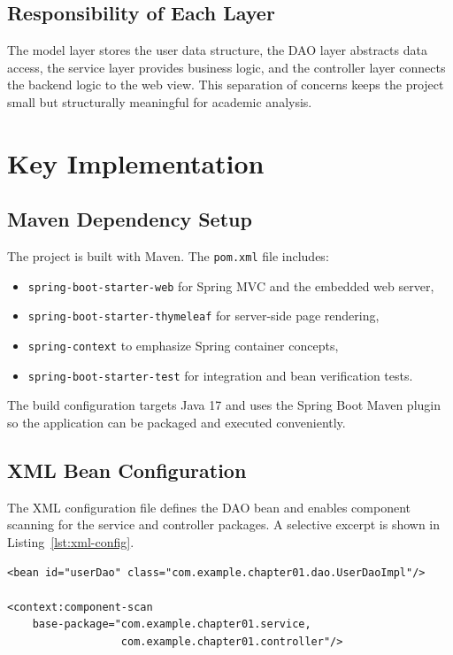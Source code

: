 \documentclass[12pt,a4paper]{article}
\begin{document}
\subsection{Responsibility of Each Layer}
The model layer stores the user data structure, the DAO layer abstracts data access, the service layer provides business logic, and the controller layer connects the backend logic to the web view. This separation of concerns keeps the project small but structurally meaningful for academic analysis.

\section{Key Implementation}

\subsection{Maven Dependency Setup}
The project is built with Maven. The \texttt{pom.xml} file includes:
\begin{itemize}
    \item \texttt{spring-boot-starter-web} for Spring MVC and the embedded web server,
    \item \texttt{spring-boot-starter-thymeleaf} for server-side page rendering,
    \item \texttt{spring-context} to emphasize Spring container concepts,
    \item \texttt{spring-boot-starter-test} for integration and bean verification tests.
\end{itemize}

The build configuration targets Java 17 and uses the Spring Boot Maven plugin so the application can be packaged and executed conveniently.

\subsection{XML Bean Configuration}
The XML configuration file defines the DAO bean and enables component scanning for the service and controller packages. A selective excerpt is shown in Listing~\ref{lst:xml-config}.

\begin{lstlisting}[style=xmlstyle, caption={Selective excerpt from applicationContext.xml}, label={lst:xml-config}]
<bean id="userDao" class="com.example.chapter01.dao.UserDaoImpl"/>

<context:component-scan
    base-package="com.example.chapter01.service,
                  com.example.chapter01.controller"/>
\end{lstlisting}
\end{document}
